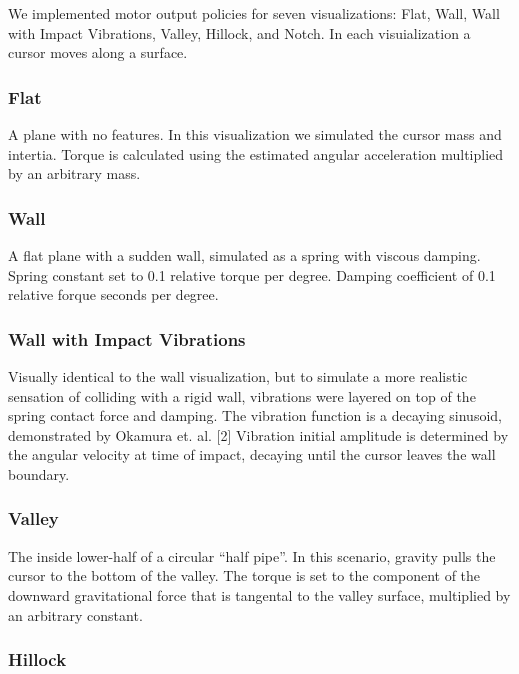 \documentclass{article}
\begin{document}
  We implemented motor output policies for seven visualizations:
  Flat, Wall, Wall with Impact Vibrations, Valley, Hillock, and Notch.
  In each visuialization a cursor moves along a surface.

  \subsubsection{Flat}

    A plane with no features.
    In this visualization we simulated the cursor mass and intertia.
    Torque is calculated using the estimated angular acceleration multiplied by an arbitrary mass.

  \subsubsection{Wall}

    A flat plane with a sudden wall, simulated as a spring with viscous damping.
    Spring constant set to 0.1 relative torque per degree.
    Damping coefficient of 0.1 relative forque seconds per degree.

  \subsubsection{Wall with Impact Vibrations}

    Visually identical to the wall visualization, but to simulate a more
    realistic sensation of colliding with a rigid wall, vibrations were
    layered on top of the spring contact force and damping.
    The vibration function is a decaying sinusoid, demonstrated by Okamura et. al. [2]
    Vibration initial amplitude is determined by the angular velocity at time of
    impact, decaying until the cursor leaves the wall boundary.

  \subsubsection{Valley}

    The inside lower-half of a circular ``half pipe''.
    In this scenario, gravity pulls the cursor to the bottom of the valley.
    The torque is set to the component of the downward gravitational force that is
    tangental to the valley surface, multiplied by an arbitrary constant.

  \subsubsection{Hillock}
\end{document}
